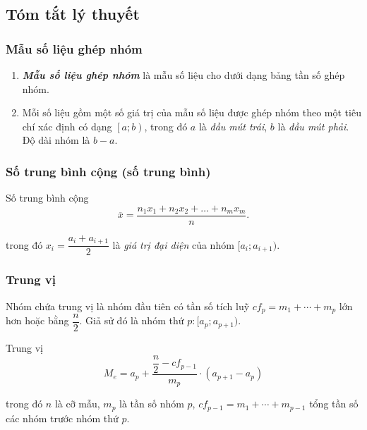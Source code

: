 \setcounter{chapter}{2}
\setcounter{subsubsection}{0}
\setcounter{ex}{0}
\setcounter{bt}{0}

\subsection{Tóm tắt lý thuyết}
\subsubsection{Mẫu số liệu ghép nhóm}
\begin{enumerate}
	\item \textbf{\textit{Mẫu số liệu ghép nhóm}} là mẫu số liệu cho dưới dạng bảng tần số ghép nhóm.
	\item Mỗi số liệu gồm một số giá trị của mẫu số liệu được ghép nhóm theo một tiêu chí xác định có dạng $\left[a;b\right)$, trong đó $a$ là \textit{đầu mút trái}, $b$ là \textit{đầu mút phải}. Độ dài nhóm là $b-a$.
\end{enumerate}
\subsubsection{Số trung bình cộng (số trung bình)}
\begin{khung4}{Số trung bình cộng}
	$$\overline{x} = \dfrac{n_1x_1 + n_2x_2 + \ldots + n_mx_m}{n}.$$
\end{khung4}
trong đó $x_i=\dfrac{a_i+a_{i+1}}{2}$ là \textit{giá trị đại diện} của nhóm $[a_i;a_{i+1})$.

\subsubsection{Trung vị}
Nhóm chứa trung vị là nhóm đầu tiên có tần số tích luỹ $cf_p=m_1 + \cdots + m_{p}$ lớn hơn hoặc bằng $\dfrac{n}{2}$. Giả sử đó là nhóm thứ $p : [a_p; a_{p + 1})$.
\begin{khung4}{Trung vị}
	$$M_e = a_p + \dfrac{\dfrac{n}{2} - cf_{p-1}}{m_p} \cdot ( a_{p + 1} - a_p)$$
\end{khung4}
trong đó $n$ là cỡ mẫu, $m_p$ là tần số nhóm $p$, $cf_{p-1}=m_1 + \cdots + m_{p-1}$ tổng tần số các nhóm trước nhóm thứ $p$.

